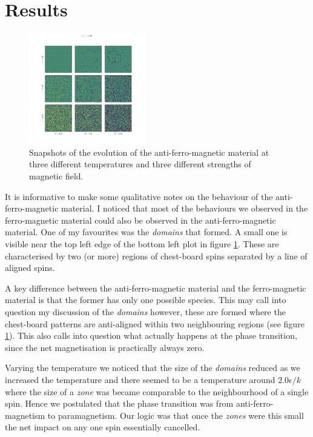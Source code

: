 \documentclass[a4paper, twocolumn]{article}
\begin{document}
\section*{Results}
\begin{figure}[h]
    \centering
    \includegraphics[width=0.45\textwidth]{pub/figures/external_field_epsilon_minus_one.pdf}
    \caption{Snapshots of the evolution of the anti-ferro-magnetic %
        material at three different temperatures and three different %
        strengths of magnetic field.}
    \label{fig:8}
\end{figure}


It is informative to make some qualitative notes on the behaviour of the %
anti-ferro-magnetic material. I noticed that most of the behaviours %
we observed in the ferro-magnetic material could also be observed %
in the anti-ferro-magnetic material. One of my favourites was the %
\emph{domains} that formed. A small one is visible near the top left %
edge of the bottom left plot in figure \ref{fig:8}. These are %
characterised by two (or more) regions of chest-board spins separated %
by a line of aligned spins.


A key difference between the anti-ferro-magnetic material and the %
ferro-magnetic material is that the former has only one possible %
species. This may call into question my discussion of the \emph{domains} %
however, these are formed where the chest-board patterns are %
anti-aligned within two neighbouring regions (see figure \ref{fig:8}). %
This also calls into question what actually happens at the phase transition, %
since the net magnetisation is practically always zero. 


Varying the temperature we noticed that the size of the \emph{domains} %
reduced as we increased the temperature and there seemed to be a %
temperature around \(2.0 \epsilon / k\) where the size of a \emph{zone} %
was became comparable to the neighbourhood of a single spin. %
Hence we postulated that the phase transition was from anti-ferro-magnetism %
to paramagnetism. Our logic was that once the \emph{zones} were this %
small the net impact on any one spin essentially cancelled.
\end{document}
